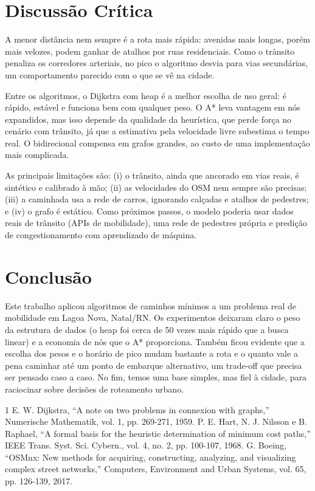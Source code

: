 \documentclass[conference]{IEEEtran}
\begin{document}
\section{Discussão Crítica}
A menor distância nem sempre é a rota mais rápida: avenidas mais longas, porém
mais velozes, podem ganhar de atalhos por ruas residenciais. Como o trânsito penaliza os
corredores arteriais, no pico o algoritmo desvia para vias secundárias, um comportamento
parecido com o que se vê na cidade.

Entre os algoritmos, o Dijkstra com heap é a melhor escolha de uso geral: é
rápido, estável e funciona bem com qualquer peso. O A* leva vantagem em nós
expandidos, mas isso depende da qualidade da heurística, que perde força no cenário com
trânsito, já que a estimativa pela velocidade livre subestima o tempo real. O
bidirecional compensa em grafos grandes, ao custo de uma implementação mais
complicada.

As principais limitações são: (i) o trânsito, ainda que ancorado em vias reais,
é sintético e calibrado à mão; (ii) as velocidades do OSM nem sempre são precisas;
(iii) a caminhada usa a rede de carros, ignorando calçadas e atalhos de pedestres; e
(iv) o grafo é estático. Como próximos passos, o modelo poderia usar dados reais
de trânsito (APIs de mobilidade), uma rede de pedestres própria e
predição de congestionamento com aprendizado de máquina.

\section{Conclusão}
Este trabalho aplicou algoritmos de caminhos mínimos a um problema real de mobilidade em
Lagoa Nova, Natal/RN. Os experimentos deixaram claro o peso da estrutura de dados (o heap
foi cerca de 50 vezes mais rápido que a busca linear) e a economia de nós que o A*
proporciona. Também ficou evidente que a escolha dos pesos e o horário de pico mudam
bastante a rota e o quanto vale a pena caminhar até um ponto de embarque alternativo, um
trade-off que precisa ser pensado caso a caso. No fim, temos uma base simples, mas
fiel à cidade, para raciocinar sobre decisões de roteamento urbano.

\begin{thebibliography}{1}
 E. W. Dijkstra, ``A note on two problems in connexion with
graphs,'' Numerische Mathematik, vol. 1, pp. 269-271, 1959.
 P. E. Hart, N. J. Nilsson e B. Raphael, ``A formal basis for the
heuristic determination of minimum cost paths,'' IEEE Trans. Syst. Sci. Cybern.,
vol. 4, no. 2, pp. 100-107, 1968.
 G. Boeing, ``OSMnx: New methods for acquiring, constructing,
analyzing, and visualizing complex street networks,'' Computers, Environment and
Urban Systems, vol. 65, pp. 126-139, 2017.
\end{thebibliography}
\end{document}
